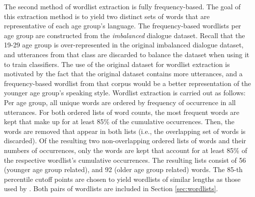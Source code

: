 The second method of wordlist extraction is fully frequency-based.
The goal of this extraction method is to yield two distinct sets of words that are representative of each age group's language. The frequency-based wordlists per age group are constructed from the \textit{imbalanced} dialogue dataset. Recall that the 19-29 age group is over-represented in the original imbalanced dialogue dataset, and utterances from that class are discarded to balance the dataset when using it to train classifiers. The use of the original dataset for wordlist extraction is motivated by the fact that the original dataset contains more utterances, and a frequency-based wordlist from that corpus would be a better representation of the younger age group's speaking style.
Wordlist extraction is carried out as follows: Per age group, all unique words are ordered by frequency of occurrence in all utterances. For both ordered lists of word counts, the most frequent words are kept that make up for at least 85\% of the cumulative occurrences.
Then, the words are removed that appear in both lists (i.e., the overlapping set of words is discarded). Of the resulting two non-overlapping ordered lists of words and their numbers of occurrences, only the words are kept that account for at least 85\% of the respective wordlist's cumulative occurrences. The resulting lists consist of 56 (younger age group related), and 92 (older age group related) words. The 85-th percentile cutoff points are chosen to yield wordlists of similar lengths as those used by \cite{dathathri2019plug}. Both pairs of wordlists are included in Section \ref{sec:wordlists}.




